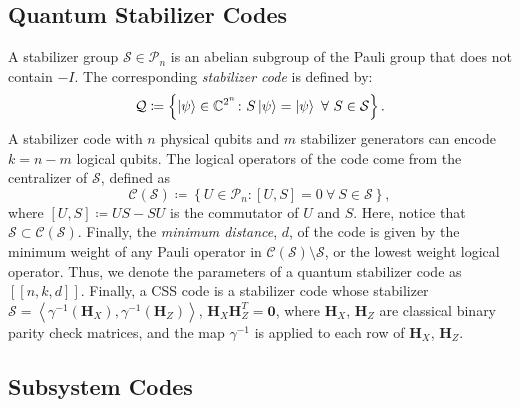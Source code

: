 \documentclass[conference]{IEEEtran}
\newcommand{\llbr}{[\![}
\newcommand{\rrbr}{]\!]}
\begin{document}
\subsection{Quantum Stabilizer Codes}



A stabilizer group $\mathcal{S}\in \mathcal{P}_{n}$ is an abelian subgroup of the Pauli group that does not contain $-I$. 
The corresponding \textit{stabilizer code} is defined by: 
\begin{equation} 
\mathcal{Q} \coloneqq \left\{ \ket{\psi} \in \mathbb{C}^{2^n} \colon S\ket{\psi}=\ket{\psi} \ \forall\ S \in \mathcal{S} \right\}.
\end{equation} 
A stabilizer code with $n$ physical qubits and $m$ stabilizer generators can encode $k=n-m$ logical qubits. The logical operators of the code come from the centralizer of $\mathcal{S}$, defined as
\begin{equation}
\mathcal{C}(\mathcal{S}) \coloneqq \left\{ U\in \mathcal{P}_{n} \colon [U,S]=0 \ \forall\ S \in \mathcal{S} \right\},
\end{equation}
where $[U,S] \coloneqq US - SU$ is the commutator of $U$ and $S$.
Here, notice that $\mathcal{S} \subset \mathcal{C}(\mathcal{S})$. 
Finally, the \textit{minimum distance}, $d$, of the code is given by the minimum weight of any Pauli operator in $\mathcal{C}(\mathcal{S}) \setminus \mathcal{S}$, or the lowest weight logical operator. 
Thus, we denote the parameters of a quantum stabilizer code as $\llbr n,k,d \rrbr$. Finally, a CSS code is a stabilizer code whose stabilizer $\mathcal{S}=\left< \gamma^{-1}(\boldsymbol{H}_{X}),\gamma^{-1}(\boldsymbol{H}_{Z})\right>$, $\boldsymbol{H}_{X}\boldsymbol{H}_{Z}^{T}=\boldsymbol{0}$, where $\boldsymbol{H}_{X}$, $\boldsymbol{H}_{Z}$ are classical binary parity check matrices, and the map $\gamma^{-1}$ is applied to each row of $\boldsymbol{H}_{X}$, $\boldsymbol{H}_{Z}$.



\subsection{Subsystem Codes}
\end{document}
